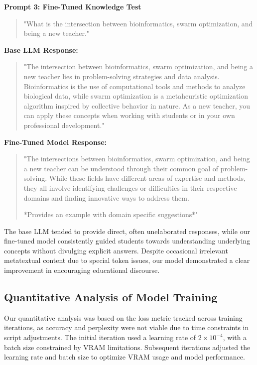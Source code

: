 \documentclass[]{article}
\begin{document}
\textbf{Prompt 3: Fine-Tuned Knowledge Test} 
\begin{quote}
"What is the intersection between bioinformatics, swarm optimization, and being a new teacher."
\end{quote}

\textbf{Base LLM Response:} 
\begin{quote}
"The intersection between bioinformatics, swarm optimization, and being a new teacher lies in problem-solving strategies and data analysis. Bioinformatics is the use of computational tools and methods to analyze biological data, while swarm optimization is a metaheuristic optimization algorithm inspired by collective behavior in nature. As a new teacher, you can apply these concepts when working with students or in your own professional development."
\end{quote}

\textbf{Fine-Tuned Model Response:} 
\begin{quote}
"The intersections between bioinformatics, swarm optimization, and being a new teacher can be understood through their common goal of problem-solving. While these fields have different areas of expertise and methods, they all involve identifying challenges or difficulties in their respective domains and finding innovative ways to address them.

*Provides an example with domain specific suggestions*"
\end{quote}

The base LLM tended to provide direct, often unelaborated responses, while our fine-tuned model consistently guided students towards understanding underlying concepts without divulging explicit answers. Despite occasional irrelevant metatextual content due to special token issues, our model demonstrated a clear improvement in encouraging educational discourse.

\subsection{Quantitative Analysis of Model Training}
Our quantitative analysis was based on the loss metric tracked across training iterations, as accuracy and perplexity were not viable due to time constraints in script adjustments. The initial iteration used a learning rate of \(2 \times 10^{-4}\), with a batch size constrained by VRAM limitations. Subsequent iterations adjusted the learning rate and batch size to optimize VRAM usage and model performance.
\end{document}
